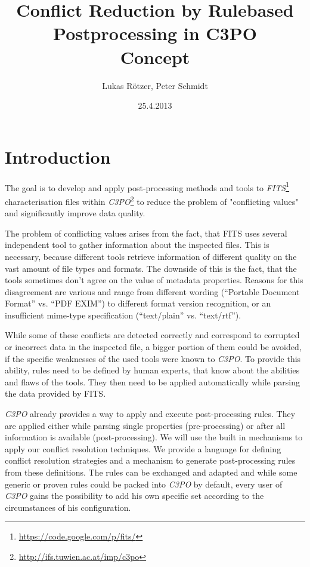 \documentclass[a4paper,12pt]{article}
\title{Conflict Reduction by Rulebased Postprocessing in C3PO\\ \medskip Concept}
\author{Lukas Rötzer, Peter Schmidt}
\date{25.4.2013}
\begin{document}
\maketitle
\thispagestyle{empty}



\section{Introduction}

The goal is to develop and apply post-processing methods and tools to \emph{FITS}\footnote{\url{https://code.google.com/p/fits/}} characterisation files within \emph{C3PO}\footnote{\url{http://ifs.tuwien.ac.at/imp/c3po}} to reduce the problem of "conflicting values" and significantly improve data quality. 

The problem of conflicting values arises from the fact, that FITS uses several independent tool to gather information about the inspected files. This is necessary, because different tools retrieve information of different quality on the vast amount of file types and formats. The downside of this is the fact, that the tools sometimes don't agree on the value of metadata properties. Reasons for this disagreement are various and range from different wording (``Portable Document Format'' vs. ``PDF EXIM'') to different format version recognition, or an insufficient mime-type specification (``text/plain'' vs. ``text/rtf''). 

While some of these conflicts are detected correctly and correspond to corrupted or incorrect data in the inspected file, a bigger portion of them could be avoided, if the specific weaknesses of the used tools were known to \emph{C3PO}. To provide this ability, rules need to be defined by human experts, that know about the abilities and flaws of the tools. They then need to be applied automatically while parsing the data provided by FITS. 

\emph{C3PO} already provides a way to apply and execute post-processing rules. They are applied either while parsing single properties (pre-processing) or after all information is available (post-processing). We will use the built in mechanisms to apply our conflict resolution techniques. We provide a language for defining conflict resolution strategies and a mechanism to generate post-processing rules from these definitions. The rules can be exchanged and adapted and while some generic or proven rules could be packed into \emph{C3PO} by default, every user of \emph{C3PO} gains the possibility to add his own specific set according to the circumstances of his configuration.
\end{document}
